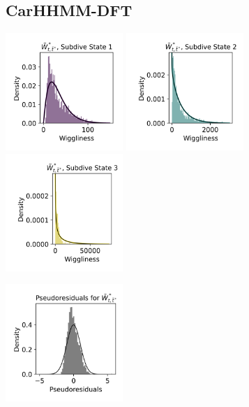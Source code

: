 \documentclass{article}
\begin{document}
        \subsection{CarHHMM-DFT}
        
        \begin{center}
        \includegraphics[width=1.75in]{../Plots/2019/20190902-182840-CATs_OB_1_0_267_CarHHMM2_empirical_hist_ahat_0.png}
        \includegraphics[width=1.75in]{../Plots/2019/20190902-182840-CATs_OB_1_0_267_CarHHMM2_empirical_hist_ahat_1.png}
        \includegraphics[width=1.75in]{../Plots/2019/20190902-182840-CATs_OB_1_0_267_CarHHMM2_empirical_hist_ahat_2.png}
        
        \includegraphics[width=1.75in]{../Plots/2019/20190902-182840-CATs_OB_1_0_267_CarHHMM2_pseudresids_ahat.png}
        \end{center}
        
\end{document}
